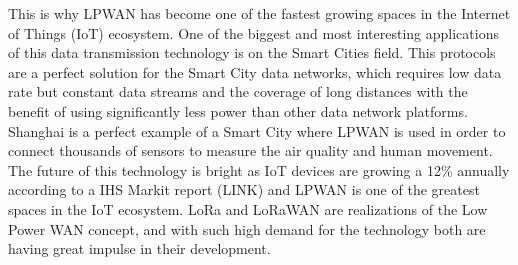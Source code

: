 This is why LPWAN has become one of the fastest growing spaces in
the Internet of Things (IoT) ecosystem. One of the biggest and most
interesting applications of this data transmission technology is on the
Smart Cities field. This protocols are a perfect solution for the Smart City
data networks, which requires low data rate but constant data streams
and the coverage of long distances with the benefit of using significantly
less power than other data network platforms. Shanghai is a perfect
example of a Smart City where LPWAN is used in order to connect
thousands of sensors to measure the air quality and human movement.
The future of this technology is bright as IoT devices are growing a 12\%
annually according to a IHS Markit report (LINK) and LPWAN is one of
the greatest spaces in the IoT ecosystem. LoRa and LoRaWAN are
realizations of the Low Power WAN concept, and with such high demand
for the technology both are having great impulse in their development.
